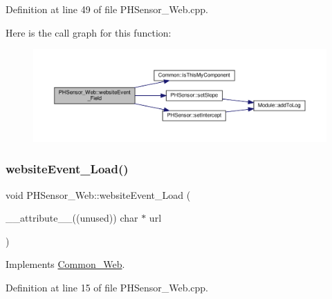 Definition at line 49 of file P\+H\+Sensor\+\_\+\+Web.\+cpp.

Here is the call graph for this function\+:
\nopagebreak
\begin{figure}[H]
\begin{center}
\leavevmode
\includegraphics[width=350pt]{class_p_h_sensor___web_a7e78a34b02adb20af3767c0db29a2dea_cgraph}
\end{center}
\end{figure}
\mbox{\label{class_p_h_sensor___web_ad986c8800153e737e43fab3bd155b8af}} 
\subsubsection{\texorpdfstring{website\+Event\+\_\+\+Load()}{websiteEvent\_Load()}}
{\footnotesize\ttfamily void P\+H\+Sensor\+\_\+\+Web\+::website\+Event\+\_\+\+Load (\begin{DoxyParamCaption}\item[{\+\_\+\+\_\+attribute\+\_\+\+\_\+((unused)) char $\ast$}]{url }\end{DoxyParamCaption})\hspace{0.3cm}{\ttfamily [virtual]}}



Implements \hyperlink{class_common___web_a5ce0d5ce6f63279c3b624371d8a76211}{Common\+\_\+\+Web}.



Definition at line 15 of file P\+H\+Sensor\+\_\+\+Web.\+cpp.

